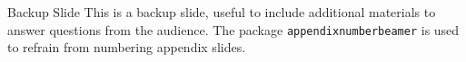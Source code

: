%

\begin{frame}{Backup Slide}
	This is a backup slide, useful to include additional materials to answer questions from the audience.
	\vfill
	The package \texttt{appendixnumberbeamer} is used to refrain from numbering appendix slides.
\end{frame}